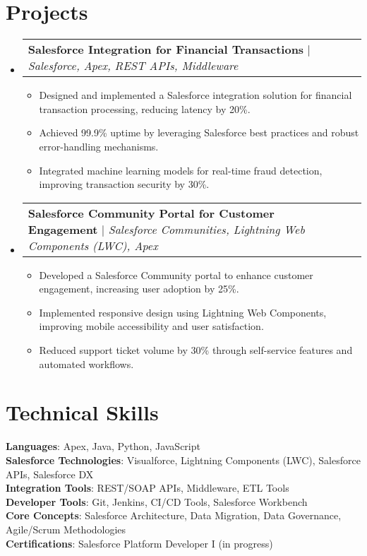 \documentclass{article}
\makeatletter
\newcommand{\resumeItem}[1]{
  \item\small{
    {#1 \vspace{-2pt}}
  }
}
\newcommand{\resumeProjectHeading}[2]{
    \item
    \begin{tabular*}{0.97\textwidth}{l@{\extracolsep{\fill}}r}
      \small#1 & #2 \\
    \end{tabular*}\vspace{-7pt}
}
\newcommand{\resumeSubHeadingListStart}{\begin{itemize}[leftmargin=0.15in, label={}]}
\newcommand{\resumeSubHeadingListEnd}{\end{itemize}}
\newcommand{\resumeItemListStart}{\begin{itemize}}
\newcommand{\resumeItemListEnd}{\end{itemize}\vspace{-5pt}}
\makeatother
\begin{document}
\section{Projects}
\resumeSubHeadingListStart
\resumeProjectHeading
{\textbf{Salesforce Integration for Financial Transactions} $|$ \emph{Salesforce, Apex, REST APIs, Middleware}}{}
\resumeItemListStart
\resumeItem{Designed and implemented a Salesforce integration solution for financial transaction processing, reducing latency by 20\%.}
\resumeItem{Achieved 99.9\% uptime by leveraging Salesforce best practices and robust error-handling mechanisms.}
\resumeItem{Integrated machine learning models for real-time fraud detection, improving transaction security by 30\%.}
\resumeItemListEnd
\resumeProjectHeading
{\textbf{Salesforce Community Portal for Customer Engagement} $|$ \emph{Salesforce Communities, Lightning Web Components (LWC), Apex}}{}
\resumeItemListStart
\resumeItem{Developed a Salesforce Community portal to enhance customer engagement, increasing user adoption by 25\%.}
\resumeItem{Implemented responsive design using Lightning Web Components, improving mobile accessibility and user satisfaction.}
\resumeItem{Reduced support ticket volume by 30\% through self-service features and automated workflows.}
\resumeItemListEnd
\resumeSubHeadingListEnd




%
\section{Technical Skills}
\begin{itemize}[leftmargin=0.15in, label={}]
\small{\item{
\textbf{Languages}: Apex, Java, Python, JavaScript \\
\textbf{Salesforce Technologies}: Visualforce, Lightning Components (LWC), Salesforce APIs, Salesforce DX \\
\textbf{Integration Tools}: REST/SOAP APIs, Middleware, ETL Tools \\
\textbf{Developer Tools}: Git, Jenkins, CI/CD Tools, Salesforce Workbench \\
\textbf{Core Concepts}: Salesforce Architecture, Data Migration, Data Governance, Agile/Scrum Methodologies \\
\textbf{Certifications}: Salesforce Platform Developer I (in progress)
}}
\end{itemize}



\end{document}
